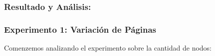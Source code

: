 \newpage

\subsubsection{Resultado y Análisis: }

\subsubsection{Experimento 1: Variación de Páginas}
Comenzemos analizando el experimento sobre la cantidad de nodos:

         \noindent{} \begin{minipage}{\textwidth}
                \begin{center}
                    \vspace{1em}


\end{center}
\end{minipage}
